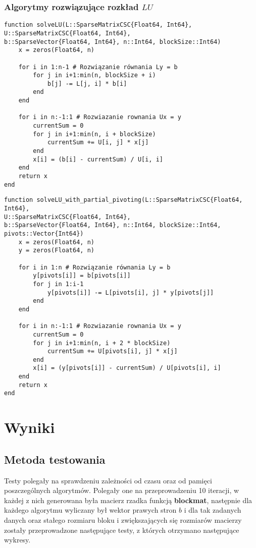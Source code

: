 \documentclass{article}
\begin{document}
\subsubsection{Algorytmy rozwiązujące rozkład $LU$}
\begin{verbatim}
function solveLU(L::SparseMatrixCSC{Float64, Int64}, U::SparseMatrixCSC{Float64, Int64},
b::SparseVector{Float64, Int64}, n::Int64, blockSize::Int64)
    x = zeros(Float64, n)

    for i in 1:n-1 # Rozwiązanie równania Ly = b
        for j in i+1:min(n, blockSize + i)
            b[j] -= L[j, i] * b[i]
        end
    end

    for i in n:-1:1 # Rozwiazanie rownania Ux = y
        currentSum = 0
        for j in i+1:min(n, i + blockSize)
            currentSum += U[i, j] * x[j]
        end
        x[i] = (b[i] - currentSum) / U[i, i]
    end
    return x
end
\end{verbatim}
\newpage
\begin{verbatim}
function solveLU_with_partial_pivoting(L::SparseMatrixCSC{Float64, Int64}, 
U::SparseMatrixCSC{Float64, Int64},
b::SparseVector{Float64, Int64}, n::Int64, blockSize::Int64, pivots::Vector{Int64})
    x = zeros(Float64, n)
    y = zeros(Float64, n)

    for i in 1:n # Rozwiązanie równania Ly = b
        y[pivots[i]] = b[pivots[i]]
        for j in 1:i-1
            y[pivots[i]] -= L[pivots[i], j] * y[pivots[j]]
        end
    end

    for i in n:-1:1 # Rozwiazanie rownania Ux = y
        currentSum = 0
        for j in i+1:min(n, i + 2 * blockSize)
            currentSum += U[pivots[i], j] * x[j]
        end
        x[i] = (y[pivots[i]] - currentSum) / U[pivots[i], i]
    end
    return x
end
\end{verbatim}
\section{Wyniki}
\subsection{Metoda testowania}
Testy polegały na sprawdzeniu zależności od czasu oraz od pamięci poszczególnych algorytmów. Polegały one na przeprowadzeniu 10 iteracji, w każdej z nich generowana była macierz rzadka funkcją \textbf{blockmat}, następnie dla każdego algorytmu wyliczany był wektor prawych stron $b$ i dla tak zadanych danych oraz stałego rozmiaru bloku i zwiększających się rozmiarów macierzy zostały przeprowadzone następujące testy, z których otrzymano następujące wykresy.
\end{document}
